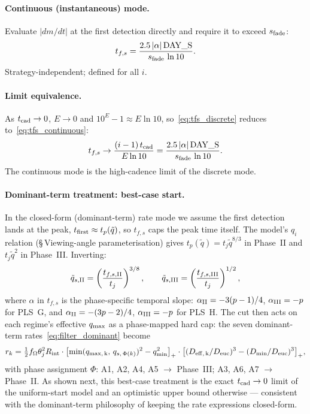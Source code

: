 \documentclass[11pt,a4paper]{article}
\begin{document}
\paragraph{Continuous (instantaneous) mode.} Evaluate $|dm/dt|$ at the first detection directly and require it to exceed $s_{\rm fade}$:
\begin{equation}
\label{eq:tfs_continuous}
t_{f,s}=\frac{2.5\,|\alpha|\,\text{DAY\_S}}{s_{\rm fade}\,\ln 10}.
\end{equation}
Strategy-independent; defined for all $i$.

\paragraph{Limit equivalence.} As $t_{\rm cad}\to 0$, $E\to 0$ and $10^E-1\approx E\ln 10$, so~\eqref{eq:tfs_discrete} reduces to~\eqref{eq:tfs_continuous}:
\[
t_{f,s}\to\frac{(i-1)\,t_{\rm cad}}{E\ln 10}=\frac{2.5\,|\alpha|\,\text{DAY\_S}}{s_{\rm fade}\,\ln 10}.
\]
The continuous mode is the high-cadence limit of the discrete mode.

\paragraph{Dominant-term treatment: best-case start.} In the closed-form (dominant-term) rate mode we assume the first detection lands at the peak, $t_{\rm first}\approx t_p(\tilde q)$, so $t_{f,s}$ caps the peak time itself. The model's $q_i$ relation (\S\,Viewing-angle parameterisation) gives $t_p(\tilde q)=t_j\tilde q^{8/3}$ in Phase~II and $t_j\tilde q^2$ in Phase~III. Inverting:
\begin{equation}
\label{eq:qs_phase}
\tilde q_{s,\rm II}=\left(\frac{t_{f,s,\rm II}}{t_j}\right)^{3/8},\qquad
\tilde q_{s,\rm III}=\left(\frac{t_{f,s,\rm III}}{t_j}\right)^{1/2},
\end{equation}
where $\alpha$ in $t_{f,s}$ is the phase-specific temporal slope: $\alpha_{\rm II}=-3(p-1)/4$, $\alpha_{\rm III}=-p$ for PLS~G, and $\alpha_{\rm II}=-(3p-2)/4$, $\alpha_{\rm III}=-p$ for PLS~H. The cut then acts on each regime's effective $q_{\rm max}$ as a phase-mapped hard cap: the seven dominant-term rates~\eqref{eq:filter_dominant} become
\[
r_k = \tfrac{1}{2}f_\Omega\theta_j^2 R_{\rm int}\cdot
\bigl[\min(q_{\rm max,\,k},\,q_{s,\,\Phi(k)})^2-q_{\rm min}^2\bigr]_+\cdot
\bigl[(D_{\rm eff,\,k}/D_{\rm euc})^3-(D_{\rm min}/D_{\rm euc})^3\bigr]_+,
\]
with phase assignment $\Phi$: A1, A2, A4, A5 $\to$ Phase~III; A3, A6, A7 $\to$ Phase~II. As shown next, this best-case treatment is the exact $t_{\rm cad}\to 0$ limit of the uniform-start model and an optimistic upper bound otherwise --- consistent with the dominant-term philosophy of keeping the rate expressions closed-form.
\end{document}

